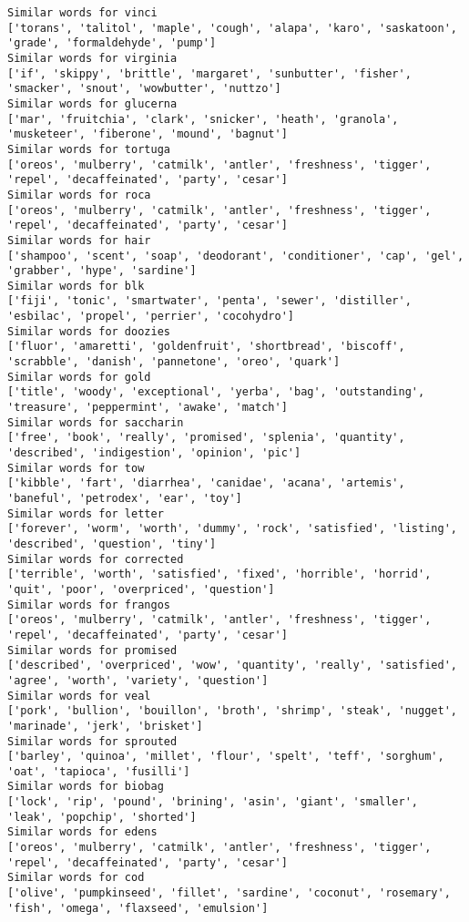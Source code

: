 \documentclass[11pt]{article}
\begin{document}
\begin{Verbatim}[commandchars=\\\{\}]
Similar words for vinci
['torans', 'talitol', 'maple', 'cough', 'alapa', 'karo', 'saskatoon', 'grade', 'formaldehyde', 'pump']
Similar words for virginia
['if', 'skippy', 'brittle', 'margaret', 'sunbutter', 'fisher', 'smacker', 'snout', 'wowbutter', 'nuttzo']
Similar words for glucerna
['mar', 'fruitchia', 'clark', 'snicker', 'heath', 'granola', 'musketeer', 'fiberone', 'mound', 'bagnut']
Similar words for tortuga
['oreos', 'mulberry', 'catmilk', 'antler', 'freshness', 'tigger', 'repel', 'decaffeinated', 'party', 'cesar']
Similar words for roca
['oreos', 'mulberry', 'catmilk', 'antler', 'freshness', 'tigger', 'repel', 'decaffeinated', 'party', 'cesar']
Similar words for hair
['shampoo', 'scent', 'soap', 'deodorant', 'conditioner', 'cap', 'gel', 'grabber', 'hype', 'sardine']
Similar words for blk
['fiji', 'tonic', 'smartwater', 'penta', 'sewer', 'distiller', 'esbilac', 'propel', 'perrier', 'cocohydro']
Similar words for doozies
['fluor', 'amaretti', 'goldenfruit', 'shortbread', 'biscoff', 'scrabble', 'danish', 'pannetone', 'oreo', 'quark']
Similar words for gold
['title', 'woody', 'exceptional', 'yerba', 'bag', 'outstanding', 'treasure', 'peppermint', 'awake', 'match']
Similar words for saccharin
['free', 'book', 'really', 'promised', 'splenia', 'quantity', 'described', 'indigestion', 'opinion', 'pic']
Similar words for tow
['kibble', 'fart', 'diarrhea', 'canidae', 'acana', 'artemis', 'baneful', 'petrodex', 'ear', 'toy']
Similar words for letter
['forever', 'worm', 'worth', 'dummy', 'rock', 'satisfied', 'listing', 'described', 'question', 'tiny']
Similar words for corrected
['terrible', 'worth', 'satisfied', 'fixed', 'horrible', 'horrid', 'quit', 'poor', 'overpriced', 'question']
Similar words for frangos
['oreos', 'mulberry', 'catmilk', 'antler', 'freshness', 'tigger', 'repel', 'decaffeinated', 'party', 'cesar']
Similar words for promised
['described', 'overpriced', 'wow', 'quantity', 'really', 'satisfied', 'agree', 'worth', 'variety', 'question']
Similar words for veal
['pork', 'bullion', 'bouillon', 'broth', 'shrimp', 'steak', 'nugget', 'marinade', 'jerk', 'brisket']
Similar words for sprouted
['barley', 'quinoa', 'millet', 'flour', 'spelt', 'teff', 'sorghum', 'oat', 'tapioca', 'fusilli']
Similar words for biobag
['lock', 'rip', 'pound', 'brining', 'asin', 'giant', 'smaller', 'leak', 'popchip', 'shorted']
Similar words for edens
['oreos', 'mulberry', 'catmilk', 'antler', 'freshness', 'tigger', 'repel', 'decaffeinated', 'party', 'cesar']
Similar words for cod
['olive', 'pumpkinseed', 'fillet', 'sardine', 'coconut', 'rosemary', 'fish', 'omega', 'flaxseed', 'emulsion']

\end{Verbatim}
\end{document}
